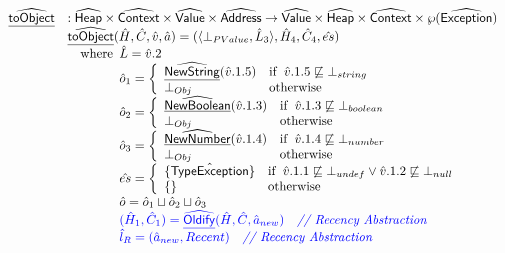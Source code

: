 \[
\begin{array}{ll}
\widehat{\underline{\sf toObject}} & : \widehat{\mbox{\textsf{Heap}}} \times \widehat{\mbox{\textsf{Context}}} \times \widehat{\mbox{\textsf{Value}}} \times \widehat{\mbox{\textsf{Address}}} \rightarrow \widehat{\mbox{\textsf{Value}}} \times \widehat{\mbox{\textsf{Heap}}} \times \widehat{\mbox{\textsf{Context}}} \times  \wp(\widehat{\mbox{\textsf{Exception}}}) \\
& \widehat{\underline{\sf toObject}}(\hat{H}, \hat{C}, \hat{v}, \hat{a})
  = (\langle\bot_{PValue},\hat{L}_3\rangle,\hat{H}_4,\hat{C}_4,\hat{es}) \\
  & \quad{\rm where}\begin{array}[t]{l}
    \hat{L} = \hat{v}.2\\
    \hat{o}_1 =
    \left\{
      \begin{array}{ll}
        \widehat{\underline{\sf NewString}}(\hat{v}.1.5) & {\rm if}\begin{array}[t]{l}\hat{v}.1.5\not\sqsubseteq\bot_{string}\end{array} \\
        \bot_{Obj} & {\rm otherwise}\\
      \end{array}
    \right.\\
    \hat{o}_2 =
    \left\{
      \begin{array}{ll}
        \widehat{\underline{\sf NewBoolean}}(\hat{v}.1.3) & {\rm if}\begin{array}[t]{l}\hat{v}.1.3\not\sqsubseteq\bot_{boolean}\end{array} \\
        \bot_{Obj} & {\rm otherwise}\\
      \end{array}
    \right.\\
    \hat{o}_3 =
    \left\{
      \begin{array}{ll}
        \widehat{\underline{\sf NewNumber}}(\hat{v}.1.4) & {\rm if}\begin{array}[t]{l}\hat{v}.1.4\not\sqsubseteq\bot_{number}\end{array} \\
        \bot_{Obj} & {\rm otherwise}\\
      \end{array}
    \right.\\
    \hat{es} = 
    \left\{
      \begin{array}{ll}
        \{\hat{\mbox{\textsf{TypeException}}}\} & {\rm if}\begin{array}[t]{l}\hat{v}.1.1\not\sqsubseteq\bot_{undef}\lor \hat{v}.1.2\not\sqsubseteq\bot_{null}\end{array} \\
        \{\} & {\rm otherwise}\\
      \end{array}
    \right.\\
    \hat{o} = \hat{o}_1 \sqcup \hat{o}_2 \sqcup \hat{o}_3 \\

    \color{blue} (\hat{H}_1, \hat{C}_1) = \widehat{\underline{\sf Oldify}}(\hat{H}, \hat{C}, \hat{a}_{new})
    \quad\textit{{\color{blue}// Recency Abstraction}}\\
    \color{blue}\hat{l}_{R} = (\hat{a}_{new}, Recent)
    \quad\textit{{\color{blue}// Recency Abstraction}}\\

\end{array}
\end{array}\]

